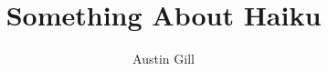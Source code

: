 \documentclass[12pt]{article}
\title{Something About Haiku}
\author{Austin Gill}
\newcommand{\onlyinsubfile}[1]{#1}
\newcommand{\notinsubfile}[1]{}
\begin{document}
\renewcommand{\onlyinsubfile}[1]{}
\renewcommand{\notinsubfile}[1]{#1}
\maketitle

\begin{abstract}
    
\end{abstract}

\tableofcontents

\newpage





\newpage


\end{document}
